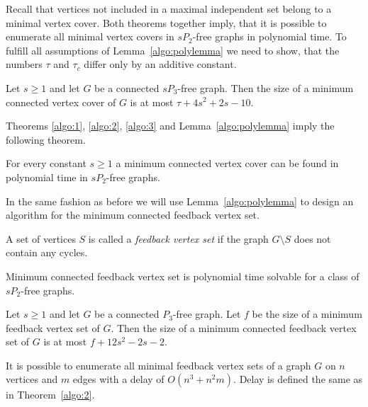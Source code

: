 Recall that vertices not included in a maximal independent set belong to a minimal vertex cover.
Both theorems together imply, that it is possible to enumerate all minimal vertex covers in \(sP_2\)-free graphs in polynomial time.
To fulfill all assumptions of Lemma~\ref{algo:polylemma} we need to show, that the numbers \(\tau\) and \(\tau_c\) differ only by an additive constant.

\begin{thm}\label{algo:3}
Let \(s \geq 1\) and let \(G\) be a connected \(sP_3\)-free graph.  
Then the size of a minimum connected vertex cover of \(G\) is at most \(\tau + 4s^{2} + 2s - 10\).
\end{thm}

Theorems \ref{algo:1}, \ref{algo:2}, \ref{algo:3} and Lemma~\ref{algo:polylemma} 
imply the following theorem.

\begin{thm}\label{algo:4}
For every constant \(s \geq 1\) a minimum connected vertex cover can be found
in polynomial time in \(sP_2\)-free graphs.
\end{thm}

In the same fashion as before we will use Lemma~\ref{algo:polylemma} to design an algorithm for the minimum connected feedback vertex set.
\begin{defn}
A set of vertices \(S\) is called a \emph{feedback vertex set} if the graph \(G\setminus S\) does not contain any cycles.
\end{defn}

\begin{thm}\label{algo:sp2feedback}
Minimum connected feedback vertex set is polynomial time solvable for a class of \(sP_2\)-free graphs.
\end{thm}

\begin{thm}\label{algo:5}
Let \(s \geq 1\) and let \(G\) be a connected \(P_3\)-free graph. 
Let \(f\) be the size of a minimum feedback vertex set of \(G\). 
Then the size of a minimum connected feedback vertex set of \(G\) is at most \(f + 12s^2 - 2s - 2\).
\end{thm}

\begin{thm}\label{algo:feedbackdelay}
It is possible to enumerate all minimal feedback vertex sets of a
graph \(G\) on \(n\) vertices and \(m\) edges with a delay of \(O(n^3 + n^2 m)\).
Delay is defined the same as in Theorem~\ref{algo:2}.
\end{thm}

